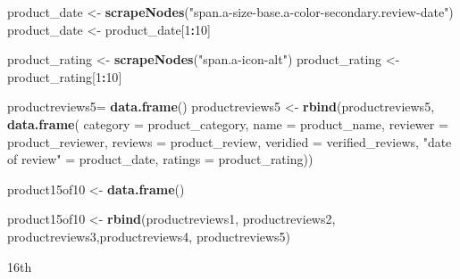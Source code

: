 \documentclass[
]{article}
\newenvironment{Shaded}{\begin{snugshade}}{\end{snugshade}}
\newcommand{\AttributeTok}[1]{\textcolor[rgb]{0.13,0.29,0.53}{#1}}
\newcommand{\DecValTok}[1]{\textcolor[rgb]{0.00,0.00,0.81}{#1}}
\newcommand{\FunctionTok}[1]{\textcolor[rgb]{0.13,0.29,0.53}{\textbf{#1}}}
\newcommand{\NormalTok}[1]{#1}
\newcommand{\OtherTok}[1]{\textcolor[rgb]{0.56,0.35,0.01}{#1}}
\newcommand{\SpecialCharTok}[1]{\textcolor[rgb]{0.81,0.36,0.00}{\textbf{#1}}}
\newcommand{\StringTok}[1]{\textcolor[rgb]{0.31,0.60,0.02}{#1}}
\begin{document}
\begin{Shaded}
\begin{Highlighting}[]
\NormalTok{  product\_date }\OtherTok{\textless{}{-}} \FunctionTok{scrapeNodes}\NormalTok{(}\StringTok{"span.a{-}size{-}base.a{-}color{-}secondary.review{-}date"}\NormalTok{)}
\NormalTok{  product\_date }\OtherTok{\textless{}{-}}\NormalTok{ product\_date[}\DecValTok{1}\SpecialCharTok{:}\DecValTok{10}\NormalTok{]}
  
\NormalTok{  product\_rating }\OtherTok{\textless{}{-}} \FunctionTok{scrapeNodes}\NormalTok{(}\StringTok{"span.a{-}icon{-}alt"}\NormalTok{)}
\NormalTok{  product\_rating }\OtherTok{\textless{}{-}}\NormalTok{ product\_rating[}\DecValTok{1}\SpecialCharTok{:}\DecValTok{10}\NormalTok{]}
  
\NormalTok{  productreviews5}\OtherTok{=} \FunctionTok{data.frame}\NormalTok{()}
\NormalTok{  productreviews5 }\OtherTok{\textless{}{-}} \FunctionTok{rbind}\NormalTok{(productreviews5, }\FunctionTok{data.frame}\NormalTok{(}
                      \AttributeTok{category =}\NormalTok{ product\_category,}
                      \AttributeTok{name =}\NormalTok{ product\_name,}
                      \AttributeTok{reviewer =}\NormalTok{ product\_reviewer,}
                      \AttributeTok{reviews =}\NormalTok{ product\_review,}
                      \AttributeTok{veridied =}\NormalTok{ verified\_reviews,}
                      \StringTok{"date of review"} \OtherTok{=}\NormalTok{ product\_date,}
                      \AttributeTok{ratings =}\NormalTok{ product\_rating))}
  
\NormalTok{  product15of10 }\OtherTok{\textless{}{-}} \FunctionTok{data.frame}\NormalTok{()}
  
\NormalTok{  product15of10 }\OtherTok{\textless{}{-}} \FunctionTok{rbind}\NormalTok{(productreviews1, productreviews2, productreviews3,productreviews4, productreviews5)}
\end{Highlighting}
\end{Shaded}

16th
\end{document}

